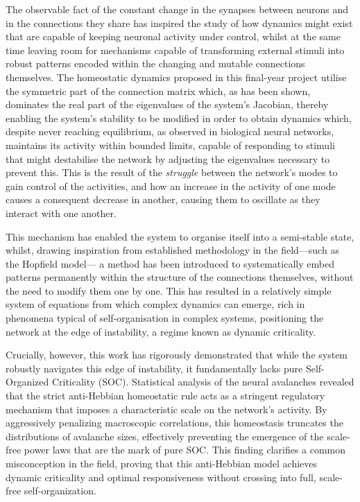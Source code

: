 \documentclass[11pt,a4paper,twoside,pdf]{article}
\numberwithin{equation}{section}
\begin{document}
The observable fact of the constant change in the synapses between neurons and in the connections they share has inspired the study of how dynamics might exist that are capable of keeping neuronal activity under control, whilst at the same time leaving room for mechanisms capable of transforming external stimuli into robust patterns encoded within the changing and mutable connections themselves. The homeostatic dynamics proposed in this final-year project utilise the symmetric part of the connection matrix which, as has been shown, dominates the real part of the eigenvalues of the system’s Jacobian, thereby enabling the system’s stability to be modified in order to obtain dynamics which, despite never reaching equilibrium, as observed in biological neural networks, maintains its activity within bounded limits, capable of responding to stimuli that might destabilise the network by adjusting the eigenvalues necessary to prevent this. This is the result of the \emph{struggle} between the network’s modes to gain control of the activities, and how an increase in the activity of one mode causes a consequent decrease in another, causing them to oscillate as they interact with one another.

This mechanism has enabled the system to organise itself into a semi-stable state, whilst, drawing inspiration from established methodology in the field—such as the Hopfield model— a method has been introduced to systematically embed patterns permanently within the structure of the connections themselves, without the need to modify them one by one. This has resulted in a relatively simple system of equations from which complex dynamics can emerge, rich in phenomena typical of self-organisation in complex systems, positioning the network at the edge of instability, a regime known as dynamic criticality.

Crucially, however, this work has rigorously demonstrated that while the system robustly navigates this edge of instability, it fundamentally lacks pure Self-Organized Criticality (SOC). Statistical analysis of the neural avalanches revealed that the strict anti-Hebbian homeostatic rule acts as a stringent regulatory mechanism that imposes a characteristic scale on the network's activity. By aggressively penalizing macroscopic correlations, this homeostasis truncates the distributions of avalanche sizes, effectively preventing the emergence of the scale-free power laws that are the mark of pure SOC. This finding clarifies a common misconception in the field, proving that this anti-Hebbian model achieves dynamic criticality and optimal responsiveness without crossing into full, scale-free self-organization.
\end{document}
